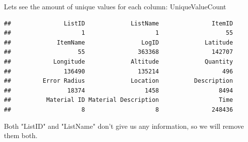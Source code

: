 \documentclass[10pt]{article}\usepackage[]{graphicx}\usepackage[]{color}
\makeatletter
\newenvironment{kframe}{%
 \def\at@end@of@kframe{}%
 \ifinner\ifhmode%
  \def\at@end@of@kframe{\end{minipage}}%
  \begin{minipage}{\columnwidth}%
 \fi\fi%
 \def\FrameCommand##1{\hskip\@totalleftmargin \hskip-\fboxsep
 \colorbox{shadecolor}{##1}\hskip-\fboxsep
     \hskip-\linewidth \hskip-\@totalleftmargin \hskip\columnwidth}%
 \MakeFramed {\advance\hsize-\width
   \@totalleftmargin\z@ \linewidth\hsize
   \@setminipage}}%
 {\par\unskip\endMakeFramed%
 \at@end@of@kframe}
\newenvironment{knitrout}{}{} %
\makeatother
\begin{document}
\begin{itemize}
Lets see the amount of unique values for each column:
UniqueValueCount
\begin{knitrout}
\color{fgcolor}\begin{kframe}
\begin{verbatim}
##               ListID             ListName               ItemID 
##                    1                    1                   55 
##             ItemName                LogID             Latitude 
##                   55               363368               142707 
##            Longitude             Altitude             Quantity 
##               136490               135214                  496 
##         Error Radius             Location          Description 
##                18374                 1458                 8494 
##          Material ID Material Description                 Time 
##                    8                    8               248436
\end{verbatim}
\end{kframe}
\end{knitrout}
Both "ListID" and "ListName" don't give us any information, so we will remove them both.


\end{itemize}
\end{document}

